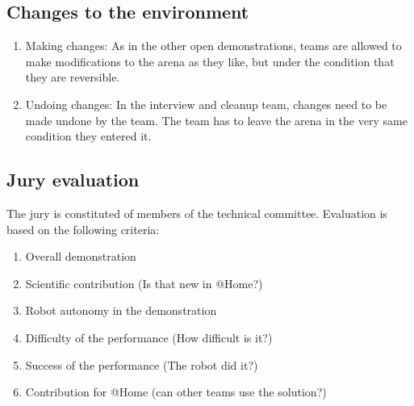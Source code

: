 \subsection{Changes to the environment}
\begin{enumerate}
  \item Making changes: As in the other open demonstrations, teams are allowed to make modifications to the arena as they like, but under the condition that they are reversible.
  \item Undoing changes: In the interview and cleanup team, changes need to be made undone by the team. The team has to leave the arena in the very same condition they entered it.
\end{enumerate}

\subsection{Jury evaluation}
The jury is constituted of members of the technical committee. Evaluation is based on the following criteria:

\begin{enumerate}
	\item Overall demonstration
	\item Scientific contribution (Is that new in @Home?)
	\item Robot autonomy in the demonstration
	\item Difficulty of the performance (How difficult is it?)
	\item Success of the performance (The robot did it?)
	\item Contribution for @Home (can other teams use the solution?)
\end{enumerate}

